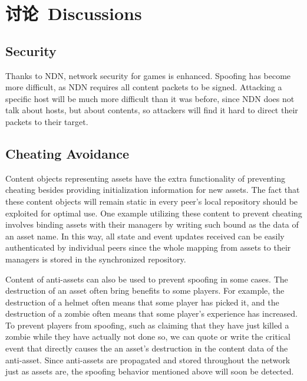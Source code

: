 \chapter{讨论~Discussions}
\label{discussions}

\section{Security}
Thanks to NDN, network security for games is enhanced. Spoofing has become more difficult, as NDN requires all content packets to be signed. Attacking a specific host will be much more difficult than it was before, since NDN does not talk about hosts, but about contents, so attackers will find it hard to direct their packets to their target.


\section{Cheating Avoidance}



Content objects representing assets have the extra functionality of preventing cheating besides providing initialization information for new assets. The fact that these content objects will remain static in every peer's local repository should be exploited for optimal use. One example utilizing these content to prevent cheating involves binding assets with their managers by writing such bound as the data of an asset name. In this way, all state and event updates received can be easily authenticated by individual peers since the whole mapping from assets to their managers is stored in the synchronized repository.

Content of anti-assets can also be used to prevent spoofing in some cases. The destruction of an asset often bring benefits to some players. For example, the destruction of a helmet often means that some player has picked it, and the destruction of a zombie often means that some player's experience has increased. To prevent players from spoofing, such as claiming that they have just killed a zombie while they have actually not done so, we can quote or write the critical event that directly causes the an asset's destruction in the content data of the anti-asset. Since anti-assets are propagated and stored throughout the network just as assets are, the spoofing behavior mentioned above will soon be detected. 

